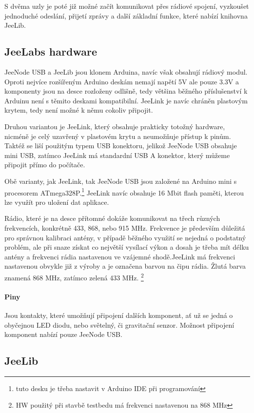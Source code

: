 \documentclass[12pt,titlepage]{article}
\begin{document}
	S dvěma uzly je poté již možné začít komunikovat přes rádiové spojení, vyzkoušet jednoduché odeslání, přijetí zprávy a další základní funkce, které nabízí knihovna JeeLib. 	
	

	\subsection{JeeLabs hardware}
		JeeNode USB a JeeLib jsou klonem Arduina, navíc však obsahují rádiový modul. Oproti nejvíce rozšířeným Arduino deskám nemají napětí 5V ale pouze 3.3V  a komponenty jsou na desce rozloženy odlišně, tedy většina běžného příslušenství k Arduinu není s těmito deskami kompatibilní. JeeLink je navíc chráněn plastovým krytem, tedy není možné k němu cokoliv připojit.
	
		Druhou variantou je JeeLink, který obsahuje prakticky totožný hardware, nicméně je celý uzavřený v plastovém krytu a neumožňuje přístup k pinům. Taktéž se liší použitým typem USB konektoru, jelikož JeeNode USB obsahuje mini USB, zatímco JeeLink má standardní USB A konektor, který můžeme připojit přímo do počítače. 
				
		Obě varianty, jak JeeLink, tak JeeNode USB jsou založené na Arduino mini s procesorem ATmega328P.\footnote{tuto desku je třeba nastavit v Arduino IDE při programování} JeeLink navíc obsahuje 16 Mbit flash paměti, kterou lze využít pro uložení dat aplikace.
		
		Rádio, které je na desce přítomné dokáže komunikovat na třech různých frekvencích, konkrétně 433, 868, nebo 915 MHz. Frekvence je především důležitá pro správnou kalibraci antény, v případě běžného využití se nejedná o podstatný problém, ale při snaze získat co největší vysílací výkon a dosah je třeba mít délku antény a frekvenci rádia nastavenou ve vzájemné shodě.JeeLink má frekvenci nastavenou obvykle již z výroby a je označena barvou na čipu rádia. Žlutá barva znamená 868 MHz, zatímco zelená 433 MHz. \footnote{HW použitý při stavbě testbedu má frekvenci nastavenou na 868 MHz}
		\paragraph{Piny}
	
		Jsou kontakty, které umožňují připojení dalších komponent, ať už se jedná o obyčejnou LED diodu, nebo světelný, či gravitační senzor. Možnost připojení komponent nabízí pouze JeeNode USB. 
	
	\subsection{JeeLib}
\end{document}
